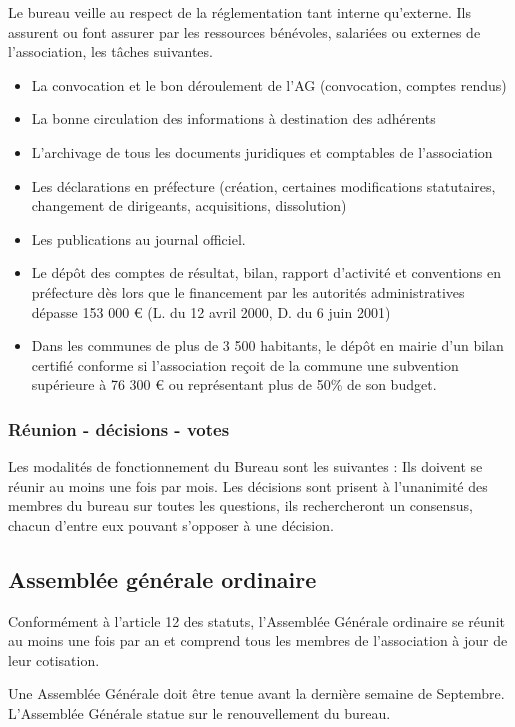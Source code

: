 \documentclass[a4paper,french,10pt]{article}
\begin{document}
Le bureau veille au respect de la réglementation tant interne
qu’externe. Ils assurent ou font assurer par les ressources bénévoles,
salariées ou externes de l’association, les tâches suivantes.
\begin{itemize}
\item La convocation et le bon déroulement de l’AG (convocation, comptes rendus)
\item La bonne circulation des informations à destination des
  adhérents
\item L’archivage de tous les documents juridiques et comptables de
  l’association
\item Les déclarations en préfecture (création, certaines
  modifications statutaires, changement de dirigeants, acquisitions,
  dissolution)
\item Les publications au journal officiel.
\item Le dépôt des comptes de résultat, bilan, rapport d’activité et
  conventions en préfecture dès lors que le financement par les
  autorités administratives dépasse 153 000 \euro{} (L. du 12 avril 2000,
  D. du 6 juin 2001)
\item Dans les communes de plus de 3 500 habitants, le dépôt en mairie
  d’un bilan certifié conforme si l’association reçoit de la commune
  une subvention supérieure à 76 300 \euro{} ou représentant plus de 50\% de son budget.
\end{itemize}

\subsubsection{Réunion - décisions - votes}
\label{sec:reun-decis-votes}

Les modalités de fonctionnement du Bureau sont les suivantes : Ils
doivent se réunir au moins une fois par mois. Les décisions sont
prisent à l'unanimité des membres du bureau sur toutes les questions,
ils rechercheront un consensus, chacun d’entre eux pouvant s’opposer à
une décision.

\subsection{Assemblée générale ordinaire}
Conformément à l'article 12 des statuts, l’Assemblée Générale ordinaire se réunit au moins une fois par an et comprend tous les membres de l’association à jour de leur cotisation.

Une Assemblée Générale doit être tenue avant la dernière semaine de Septembre. L'Assemblée Générale statue sur le renouvellement du bureau.
\end{document}
